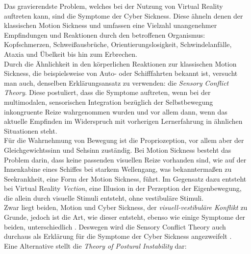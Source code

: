 Das gravierendste Problem, welches bei der Nutzung von Virtual Reality auftreten kann, sind die Symptome der Cyber Sickness. Diese ähneln denen der klassischen Motion Sickness und umfassen eine Vielzahl unangenehmer Empfindungen und Reaktionen durch den betroffenen Organismus: Kopfschmerzen, Schweißausbrüche, Orientierungslosigkeit, Schwindelanfälle, Ataxia und Übelkeit bis hin zum Erbrechen\cite{LaViola:2000:CSinVR, Kolasinski:1998:SympCS}.\\
Durch die Ähnlichkeit in den körperlichen Reaktionen zur klassischen Motion Sickness, die beispielsweise von Auto- oder Schifffahrten bekannt ist, versucht man auch, denselben Erklärungsansatz zu verwenden: die \textit{Sensory Conflict Theory}\cite{Kolasinski:1998:SympCS,Johnson:2005:SCT_Expl}.
Diese postuliert, dass die Symptome auftreten, wenn bei der multimodalen, sensorischen Integration bezüglich der Selbstbewegung inkongruente Reize wahrgenommen wurden und vor allem dann, wenn das aktuelle Empfinden im Widerspruch mit vorherigen Lernerfahrung in ähnlichen Situationen steht\cite{Reason:1975:MSexp}.\\
Für die Wahrnehmung von Bewegung ist die Propriozeption, vor allem aber der Gleichgewichtssinn und Sehsinn zuständig.
Bei Motion Sickness besteht das Problem darin, dass keine passenden visuellen Reize vorhanden sind, wie auf der Innenkabine eines Schiffes bei starkem Wellengang, was bekanntermaßen zu Seekrankheit, eine Form der Motion Sickness, führt.
Im Gegensatz dazu entsteht bei Virtual Reality \textit{Vection}, eine Illusion in der Perzeption der Eigenbewegung, die allein durch visuelle Stimuli entsteht, ohne vestibuläre Stimuli.\\
Zwar liegt beiden, Motion und Cyber Sickness, der \textit{visuell-vestibuläre Konflikt} zu Grunde, jedoch ist die Art, wie dieser entsteht, ebenso wie einige Symptome der beiden, unterschiedlich \cite{Stanney:1997:MSCSSS}. Deswegen wird die Sensory Conflict Theory auch durchaus als Erklärung für die Symptome der Cyber Sickness angezweifelt  \cite{Kolasinski:1998:SympCS}.\\
Eine Alternative stellt die \textit{Theory of Postural Instability} dar: